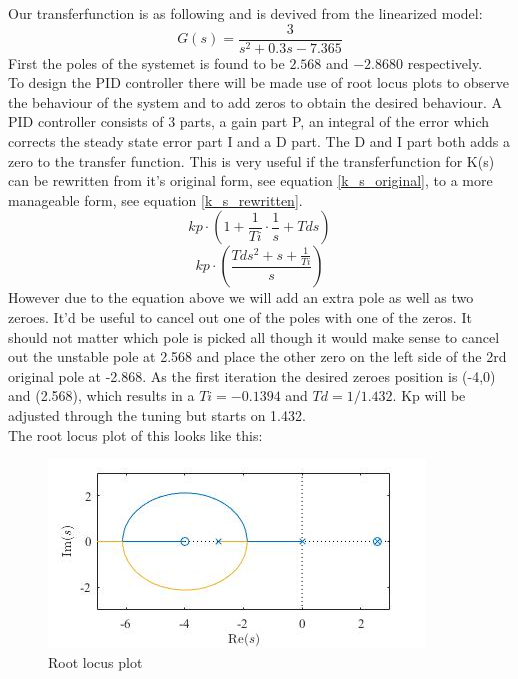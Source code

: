 \documentclass[12pt]{article}
\begin{document}
Our transferfunction is as following and is devived from the linearized model:
\begin{equation} \label{G_s}
  G(s) = \frac{3}{s^2 + 0.3s -7.365}
\end{equation}
First the poles of the systemet is found to be $2.568$ and $-2.8680$ respectively.\\
To design the PID controller there will be made use of root locus plots to observe the behaviour of the system and to add zeros to obtain the desired behaviour. A PID controller consists of 3 parts, a gain part P, an integral of the error which corrects the steady state error part I and a D part. The D and I part both adds a zero to the transfer function. This is very useful if the transferfunction for K(s) can be rewritten from it's original form, see equation \ref{k_s_original}, to a more manageable form, see equation \ref{k_s_rewritten}.
\begin{equation} \label{k_s_original}
  kp\cdot(1+\frac{1}{Ti}\cdot \frac{1}{s}+Tds)
\end{equation}
\begin{equation} \label{k_s_rewritten}
  kp\cdot(\frac{Tds^2 + s + \frac{1}{Ti}}{s})
\end{equation}
However due to the equation above we will add an extra pole as well as two zeroes. It'd be useful to cancel out one of the poles with one of the zeros. It should not matter which pole is picked all though it would make sense to cancel out the unstable pole at 2.568 and place the other zero on the left side of the 2rd original pole at -2.868. As the first iteration the desired zeroes position is (-4,0) and (2.568), which results in a $Ti = -0.1394$ and $Td = 1/1.432$. Kp will be adjusted through the tuning but starts on 1.432.\\
The root locus plot of this looks like this:
\begin{figure}[htbp]
  \centering
  \includegraphics{images/rlocus.jpg}
  \caption{Root locus plot} \label{my_root_locus_plot}
\end{figure}
\end{document}
